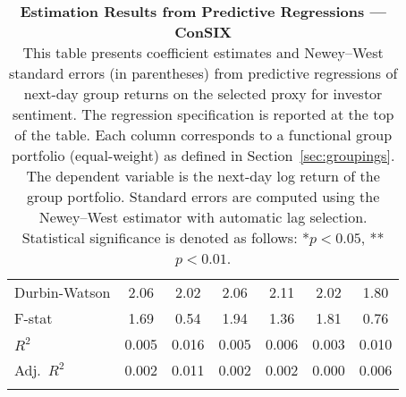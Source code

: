 \begin{table}[ht]
\begin{tabular}{l *{6}{c}}
Durbin-Watson & 2.06 & 2.02 & 2.06 & 2.11 & 2.02 & 1.80 \\
F-stat & 1.69 & 0.54 & 1.94 & 1.36 & 1.81 & 0.76 \\
\(R^2\) & 0.005 & 0.016 & 0.005 & 0.006 & 0.003 & 0.010 \\
Adj.\ \(R^2\) & 0.002 & 0.011 & 0.002 & 0.002 & 0.000 & 0.006 \\
\addlinespace
\midrule
\multicolumn{7}{c}{Specification tested: $R_{g,t+1} = \alpha_g + \beta_{sent,g} S_t + \phi R_{g,t} + \theta B_{g,t} + \gamma M_t + \varepsilon_{g,t+1}$}\\
\bottomrule
\end{tabular}
\caption{\textbf{Estimation Results from Predictive Regressions — ConSIX} \\
This table presents coefficient estimates and Newey--West standard errors (in parentheses) from predictive regressions of next-day group returns on the selected proxy for investor sentiment.
The regression specification is reported at the top of the table. Each column corresponds to a functional group portfolio (equal-weight) as defined in Section~\ref{sec:groupings}.
The dependent variable is the next-day log return of the group portfolio. Standard errors are computed using the Newey--West estimator with automatic lag selection. Statistical significance is denoted as follows: *$p<0.05$, **$p<0.01$.}
\label{tab:h2_consix_results}
\end{table}